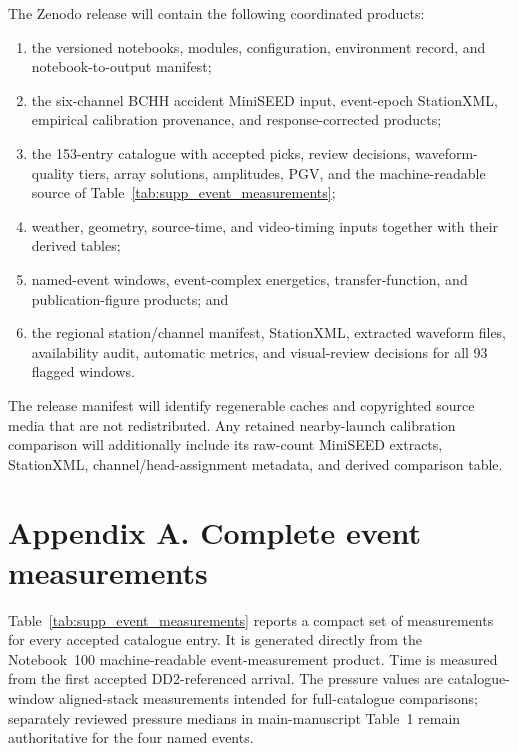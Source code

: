 \documentclass[]{seismica}
\begin{document}
The Zenodo release will contain the following coordinated products:
\begin{enumerate}
  \item the versioned notebooks, modules, configuration, environment record,
        and notebook-to-output manifest;
  \item the six-channel BCHH accident MiniSEED input, event-epoch StationXML,
        empirical calibration provenance, and response-corrected products;
  \item the 153-entry catalogue with accepted picks, review decisions,
        waveform-quality tiers, array solutions, amplitudes, PGV, and the
        machine-readable source of Table~\ref{tab:supp_event_measurements};
  \item weather, geometry, source-time, and video-timing inputs together with
        their derived tables;
  \item named-event windows, event-complex energetics, transfer-function, and
        publication-figure products; and
  \item the regional station/channel manifest, StationXML, extracted waveform
        files, availability audit, automatic metrics, and visual-review
        decisions for all 93 flagged windows.
\end{enumerate}
The release manifest will identify regenerable caches and copyrighted source
media that are not redistributed. Any retained nearby-launch calibration
comparison will additionally include its raw-count MiniSEED extracts,
StationXML, channel/head-assignment metadata, and derived comparison table.

\clearpage
\section*{Appendix A. Complete event measurements}
\label{app:supp_event_measurements}

Table~\ref{tab:supp_event_measurements} reports a compact set of measurements
for every accepted catalogue entry. It is generated directly from the
Notebook~100 machine-readable event-measurement product. Time is measured from
the first accepted DD2-referenced arrival. The pressure values are
catalogue-window aligned-stack measurements intended for full-catalogue
comparisons; separately reviewed pressure medians in main-manuscript Table~1
remain authoritative for the four named events.
\end{document}
